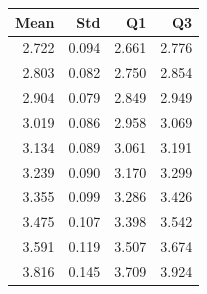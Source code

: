 \begin{tabular}{rrrr}
\toprule
Mean & Std & Q1 & Q3 \\
\midrule
2.722 & 0.094 & 2.661 & 2.776 \\
2.803 & 0.082 & 2.750 & 2.854 \\
2.904 & 0.079 & 2.849 & 2.949 \\
3.019 & 0.086 & 2.958 & 3.069 \\
3.134 & 0.089 & 3.061 & 3.191 \\
3.239 & 0.090 & 3.170 & 3.299 \\
3.355 & 0.099 & 3.286 & 3.426 \\
3.475 & 0.107 & 3.398 & 3.542 \\
3.591 & 0.119 & 3.507 & 3.674 \\
3.816 & 0.145 & 3.709 & 3.924 \\
\bottomrule
\end{tabular}
